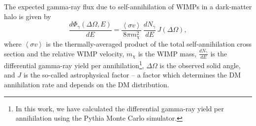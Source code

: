\documentclass[12pt,manuscript]{aastex}
\newcommand{\expval}[1]{\left\langle #1 \right\rangle}
\begin{document}
The expected gamma-ray flux due to self-annihilation of WIMPs in a
dark-matter halo is given by 
\begin{equation}
\frac{d\Phi_{\gamma}(\Delta\Omega,E)}{dE}=
\frac{\expval{\sigma v}}{8\pi m_{\chi}^{2}}\,\frac{dN_{\gamma}}{dE}\, J(\Delta\Omega),
\label{eqn:WIMPflux}
\end{equation}
where $\expval{\sigma v}$ is the thermally-averaged product of the total self-annihilation cross
section and the relative WIMP velocity, $m_{\chi}$ is the WIMP mass, $\frac{dN_{\gamma}}{dE}$ is the
differential gamma-ray yield per annihilation\footnote{In this work, we have calculated the
differential gamma-ray yield per annihilation using the Pythia Monte Carlo simulator.},
$\Delta\Omega$ is the observed solid angle, and $J$ is the so-called
astrophysical factor -- a 
factor which determines the DM annihilation rate and depends on the DM distribution.
\end{document}
